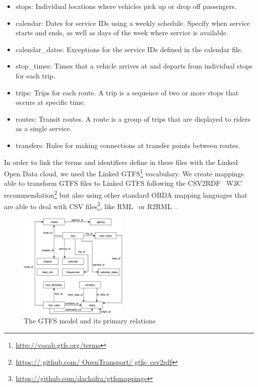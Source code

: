 \documentclass[sw]{iosart2x}
\begin{document}
\begin{itemize}
	\item stops: Individual locations where vehicles pick up or drop off passengers.
	\item calendar: Dates for service IDs using a weekly schedule. Specify when service starts and ends, as well as days of the week where service is available.
	\item calendar\_dates: Exceptions for the service IDs defined in the calendar file.
	\item stop\_times: Times that a vehicle arrives at and departs from individual stops for each trip.
	\item trips: Trips for each route. A trip is a sequence of two or more stops that occurs at specific time.
	\item routes: Transit routes. A route is a group of trips that are displayed to riders as a single service.
	\item transfers: Rules for making connections at transfer points between routes.
\end{itemize}

In order to link the terms and identifiers define in these files with the Linked Open Data cloud, we used the Linked GTFS\footnote{\url{http://vocab.gtfs.org/terms}} vocabulary. We create mappings able to transform GTFS files to Linked GTFS following the CSV2RDF~\cite{tennison2015model} W3C recommendation\footnote{\url{https:// github.com/ OpenTransport/ gtfs- csv2rdf}} but also using other standard OBDA mapping languages that are able to deal with CSV files\footnote{\url{https://github.com/dachafra/gtfsmappings}}, like RML~\cite{dimou2014rml} or R2RML~\cite{das2012r2rml}. 

\begin{figure}[t]
	\includegraphics[width=0.47\textwidth]{images/gtfsmodel.png}
	\caption{The GTFS model and its primary relations}\label{fig:gtfs}
\end{figure}
\end{document}
